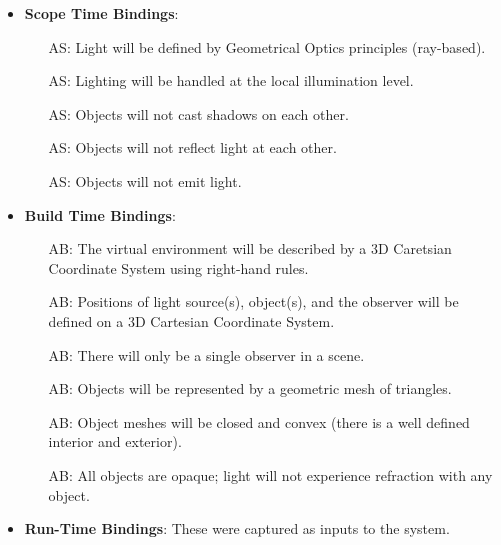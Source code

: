 \documentclass[12pt]{article}
\newcounter{assumpnum} %
\newcounter{assumpnumS} %
\newcounter{assumpnumB} %
\begin{document}
\begin{itemize}
	\item \textbf{Scope Time Bindings}:
	\begin{itemize}
		\item[AS\refstepcounter{assumpnumS}\theassumpnumS\label{as-geometrical_appx}:]
		Light will be defined by Geometrical Optics principles (ray-based).
		\item[AS\refstepcounter{assumpnumS}\theassumpnumS\label{as-illumination}:]
		Lighting will be handled at the local illumination level.
		\item[AS\refstepcounter{assumpnumS}\theassumpnumS\label{as-loc-vs-global}:]
		Objects will not cast shadows on each other.		
		\item[AS\refstepcounter{assumpnumS}\theassumpnumS\label{as-illum_constraint}:]
		Objects will not reflect light at each other.
		\item[AS\refstepcounter{assumpnumS}\theassumpnumS\label{as-emission_constraint}:]
		Objects will not emit light.		
	\end{itemize}
	\item \textbf{Build Time Bindings}:
	\begin{itemize}
		\item[AB\refstepcounter{assumpnumB}\theassumpnumB\label{as-coordinate_system}:]
		 The virtual environment will be described by a 3D Caretsian Coordinate 
		System using right-hand rules.
		\item[AB\refstepcounter{assumpnumB}\theassumpnumB\label{as-coordinates}:]
		Positions of light source(s), object(s), and the observer will be 
		defined on a 3D Cartesian Coordinate System.
		\item[AB\refstepcounter{assumpnumB}\theassumpnumB\label{as-obsv_total}:]
		There will only be a single observer in a scene.				
		\item[AB\refstepcounter{assumpnumB}\theassumpnumB\label{as-object_representation}:]
		Objects will be represented by a geometric mesh of triangles.
		\item[AB\refstepcounter{assumpnumB}\theassumpnumB\label{as-object_representation2}:]
		Object meshes will be closed and convex (there is a well defined 
		interior and exterior).				
		\item[AB\refstepcounter{assumpnumB}\theassumpnumB\label{as-object_refraction}:]
		All objects are opaque; light will not experience refraction with any 
		object. 
	\end{itemize}
	\item \textbf{Run-Time Bindings}: These were captured as inputs to the 
	system.
\end{itemize}
\end{document}
